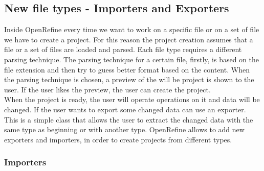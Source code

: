 \subsection{New file types - Importers and Exporters}
Inside OpenRefine every time we want to work on a specific file or on a set of file we have to create a project. For this reason the project creation assumes that a file or a set of files are loaded and parsed. Each file type requires a different parsing technique. The parsing technique for a certain file, firstly, is based on the file extension and then try to guess better format based on the content. When the parsing technique is chosen, a preview of the will be project is shown to the user. If the user likes the preview, the user can create the project. \\
When the project is ready, the user will operate operations on it and data will be changed. If the user wants to export some changed data can use an exporter. This is a simple class that allows the user to extract the changed data with the same type as beginning or with another type. OpenRefine allows to add new exporters and importers, in order to create projects from different types.

\subsubsection{Importers}
